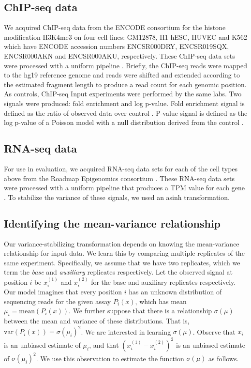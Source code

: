 \documentclass[11pt]{article}
\begin{document}
\subsection{ChIP-seq data}
We acquired ChIP-seq data from the ENCODE consortium for the histone modification H3K4me3 on four cell lines: GM12878, H1-hESC, HUVEC and K562 which have ENCODE accession numbers ENCSR000DRY, ENCSR019SQX, ENCSR000AKN and ENCSR000AKU, respectively.
These ChIP-seq data sets were processed with a uniform pipeline \cite{encode2012integrated}.
Briefly, the ChIP-seq reads were mapped to the hg19 reference genome and reads were shifted and extended according to the estimated fragment length to produce a read count for each genomic position.
As controls, ChIP-seq Input experiments were performed by the same labs.
Two signals were produced: fold enrichment and log p-value.
Fold enrichment signal is defined as the ratio of observed data over control \cite{hoffman2012integrative}.
P-value signal is defined as the log p-value of a Poisson model with a null distribution derived from the control \cite{kundaje2015integrative}. 

\subsection{RNA-seq data}
For use in evaluation, we acquired RNA-seq data sets for each of the cell types above from the Roadmap Epigenomics consortium \cite{kundaje2015integrative}. 
These RNA-seq data sets were processed with a uniform pipeline that produces a TPM value for each gene \cite{kundaje2015integrative}. 
To stabilize the variance of these signals, we used an asinh transformation. 

\subsection{Identifying the mean-variance relationship}

Our variance-stabilizing transformation depends on knowing the mean-variance relationship for input data. 
We learn this by comparing multiple replicates of the same experiment.
Specifically, we assume that we have two replicates, which we term the \emph{base}  and \emph{auxiliary} replicates respectively. 
Let the observed signal at position $i$ be $x^{(1)}_i$ and $x^{(2)}_i$ for the base and auxiliary replicates respectively. 
Our model imagines that every position $i$ has an unknown distribution of sequencing reads for the given assay $P_i(x)$, which has mean $\mu_i = \text{mean}(P_i(x))$. 
We further suppose that there is a relationship  $\sigma(\mu)$ between the mean and variance of these distributions. That is, $\text{var}(P_i(x)) = \sigma(\mu_i)^2$. 
We are interested in learning $\sigma(\mu)$. 
Observe that $x_i$ is an unbiased estimate of $\mu_i$, and that $(x_i^{(1)}-x^{(2)}_i)^2$ is an unbiased estimate of $\sigma(\mu_i)^2$. 
We use this observation to estimate the function $\sigma(\mu)$ as follows. 
\end{document}
